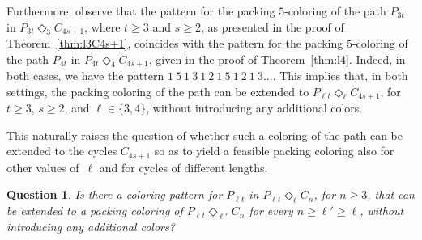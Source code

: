 \documentclass{article}
\newtheorem{question}{Question}
\begin{document}
Furthermore, observe that the pattern for the packing $5$-coloring of the path $P_{3t}$ in $P_{3t} \Diamond_3 C_{4s+1}$, where $t \geq 3$ and $s \geq 2$, as presented in the proof of Theorem~\ref{thm:l3C4s+1}, coincides with the pattern for the packing $5$-coloring of the path $P_{4t}$ in $P_{4t} \Diamond_4 C_{4s+1}$, given in the proof of Theorem~\ref{thm:l4}. Indeed, in both cases, we have the pattern $1\ 5\ 1\ 3 \ 1 \ 2 \ 1 \ 5 \ 1 \ 2 \ 1 \ 3 \ldots$. This implies that, in both settings, the packing coloring of the path can be extended to $P_{\ell t} \Diamond_{\ell} C_{4s+1}$, for $t \geq 3$, $s \geq 2$, and $\ell \in \{3,4\}$, without introducing any additional colors.

This naturally raises the question of whether such a coloring of the path can be extended to the cycles $C_{4s+1}$ so as to yield a feasible packing coloring also for other values of~$\ell$ and for cycles of different lengths.

\begin{question}
Is there a coloring pattern for $P_{\ell t}$ in $P_{\ell t} \Diamond_{\ell} C_n$, for $n \geq 3$, that can be extended to a packing coloring of $P_{\ell t} \Diamond_{\ell'} C_n$ for every $n \geq \ell' \geq \ell$, without introducing any additional colors?
\end{question}



\end{document}
